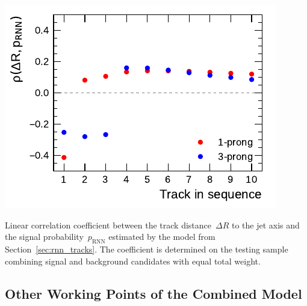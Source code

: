 \noindent
\begin{minipage}{\textwidth}
  \captionsetup{type=figure}
  \centering
  \includegraphics{./figures/rnn/track/dR_corr.pdf}
  \caption[Correlation of track $\Delta R$ and signal probability in the
  Track--RNN]{Linear correlation coefficient between the track
    distance~$\Delta R$ to the jet axis and the signal
    probability~$p_\text{RNN}$ estimated by the model from
    Section~\ref{sec:rnn_tracks}. The coefficient is determined on the testing
    sample combining signal and background candidates with equal total weight.}
\end{minipage}

\subsection{Other Working Points of the Combined Model}
\label{app:rnn_wp}

